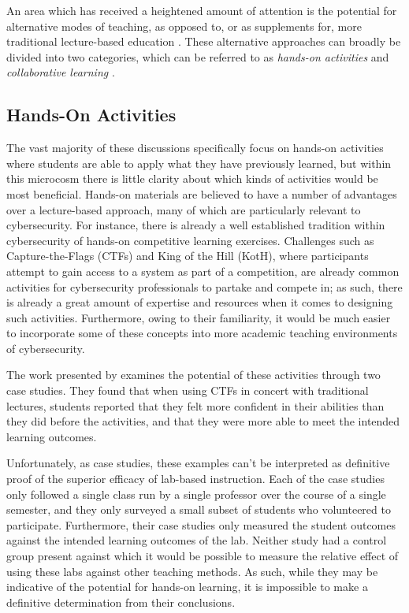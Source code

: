     An area which has received a heightened amount of attention is the potential for alternative modes of teaching, as opposed to, or as supplements for, more traditional lecture-based education \cite{Z-Zeng,N-Eliot,E-Gavas,C-Herr,K-Chung, C-Kussmaul,K-Leune,B-Payne,L-Thomas}. %
These alternative approaches can broadly be divided into two categories, which can be referred to as \emph{hands-on activities} and \emph{collaborative learning} \cite{P-Deshpande,C-Kussmaul,B-Payne}.

\subsection{Hands-On Activities}


    The vast majority of these discussions specifically focus on hands-on activities where students are able to apply what they have previously learned, but within this microcosm there is little clarity about which kinds of activities would be most beneficial. Hands-on materials are believed to have a number of advantages over a lecture-based approach, many of which are particularly relevant to cybersecurity. %
For instance, there is already a well established tradition within cybersecurity of hands-on competitive learning exercises. %
Challenges such as Capture-the-Flags (CTFs) and King of the Hill (KotH), where participants attempt to gain access to a system as part of a competition, are already common activities for cybersecurity professionals to partake and compete in; %
as such, there is already a great amount of expertise and resources when it comes to designing such activities. %
Furthermore, owing to their familiarity, it would be much easier to incorporate some of these concepts into more academic teaching environments of cybersecurity.

    The work presented by \textcite{K-Leune} examines the potential of these activities through two case studies. %
They found that when using CTFs in concert with traditional lectures, students reported that they felt more confident in their abilities than they did before the activities, and that they were more able to meet the intended learning outcomes. 

    Unfortunately, as case studies, these examples can't be interpreted as definitive proof of the superior efficacy of lab-based instruction. %
Each of the case studies only followed a single class run by a single professor over the course of a single semester, and they only surveyed a small subset of students who volunteered to participate. %
Furthermore, their case studies only measured the student outcomes against the intended learning outcomes of the lab. %
Neither study had a control group present against which it would be possible to measure the relative effect of using these labs against other teaching methods. %
As such, while they may be indicative of the potential for hands-on learning, it is impossible to make a definitive determination from their conclusions.

